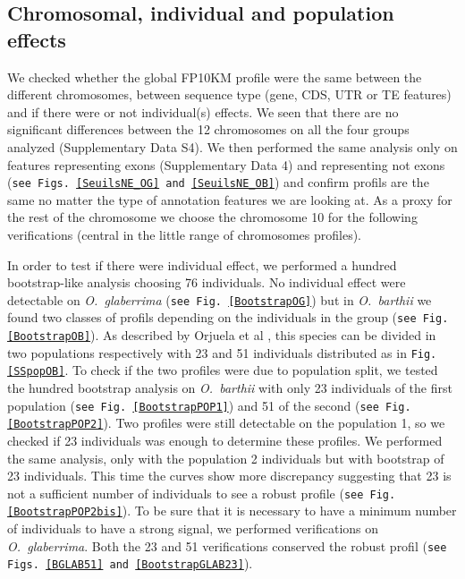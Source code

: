 \documentclass[10pt,letterpaper]{article}
\begin{document}
\subsection*{Chromosomal, individual and population effects}
We checked whether the global FP10KM profile were the same between the different chromosomes, between sequence type (gene, CDS, UTR or TE features) and if there were or not individual(s) effects. We seen that there are no significant differences between the 12 chromosomes on all the four groups analyzed (Supplementary Data S4).
We then performed the same analysis only on features representing exons (Supplementary Data 4) and representing not exons (\texttt{see Figs.~\ref{SeuilsNE_OG} and \ref{SeuilsNE_OB}}) and confirm profils are the same no matter the type of annotation features we are looking at. As a proxy for the rest of the chromosome we choose the chromosome 10 for the following verifications (central in the little range of chromosomes profiles).

In order to test if there were individual effect, we performed a hundred bootstrap-like analysis choosing 76 individuals.
No individual effect were detectable on \emph{O.~glaberrima} (\texttt{see Fig. \ref{BootstrapOG}}) but in \emph{O.~barthii} we found two classes of profils depending on the individuals in the group 
(\texttt{see Fig. \ref{BootstrapOB}}).
As described by Orjuela et al \cite{Orjuela2014}, this species can be divided in two populations respectively with 23 and 51 individuals distributed as in \texttt{Fig. \ref{SSpopOB}}.
To check if the two profiles were due to population split, we tested the hundred bootstrap analysis on \emph{O.~barthii} with only 23 individuals of the first population (\texttt{see Fig. \ref{BootstrapPOP1}}) 
and 51 of the second (\texttt{see Fig. \ref{BootstrapPOP2}}).
Two profiles were still detectable on the population 1, so we checked if 23 individuals was enough to determine these profiles. We performed the same analysis, only with the population 2 individuals but
with bootstrap of 23 individuals. This time the curves show more discrepancy suggesting that 23 is not a sufficient number of individuals to see a robust profile (\texttt{see Fig. \ref{BootstrapPOP2bis}}).
To be sure that it is necessary to have a minimum number of individuals to have a strong signal, we performed verifications on \emph{O.~glaberrima}. Both the 23 and 51 verifications conserved the robust profil 
(\texttt{see Figs. \ref{BGLAB51} and \ref{BootstrapGLAB23}}).
\end{document}
